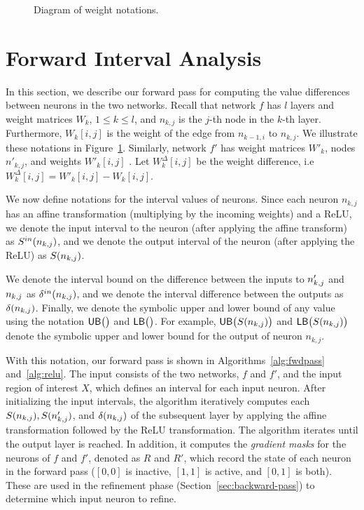 \begin{figure}
	\centering
	\scalebox{0.8}{
	
	}
	\caption{Diagram of weight notations.\label{fig:neuron_weights}}
\end{figure}

\section{Forward Interval Analysis}
\label{sec:forward-pass}

In this section, we describe our forward pass for computing the value
differences between neurons in the two networks.
Recall that network $f$ has $l$ layers and weight matrices $W_k$,
$1 \leq k \leq l$, and $n_{k,j}$ is the $j$-th node in the $k$-th
layer. Furthermore, $W_k[i,j]$ is the weight of the edge from
$n_{{k-1},i}$ to $n_{k,j}$. We illustrate these notations in Figure~\ref{fig:neuron_weights}.
%
Similarly, network $f'$ has weight matrices $ W'_k$, nodes $n'_{k,j}$,
and weights $W'_k[i,j]$ .
%
Let $ W^\Delta_k[i,j] $ be the weight difference, i.e $ W^\Delta_k[i,j] = W'_k[i,j]-W_k[i,j] $.


We now define notations for the interval values of neurons.
%
Since each neuron $n_{k,j}$ has an affine transformation (multiplying by the incoming weights)
and a ReLU, we denote the input interval to the neuron (after applying the affine transform) as $S^{in}(n_{k,j})$,
%
and we denote the output interval of the neuron (after applying
the ReLU) as $S(n_{k,j})$.
%
%
We denote the interval bound on the difference between the inputs to
$ n'_{k,j} $ and $ n_{k,j} $ as
$\delta^{in}(n_{k,j})$, and we denote the interval
difference between the outputs as $\delta(n_{k,j})$.
%
Finally, we denote the symbolic upper and lower bound of any value using the notation
$\mathsf{UB}\big(\big)$ and $\mathsf{LB}\big(\big)$. For example, $ \mathsf{UB}\big(S(n_{k,j})\big) $ and $ \mathsf{LB}\big(S(n_{k,j})\big)$
denote the symbolic upper and lower bound for the output of neuron $ n_{k,j} $.


With this notation, our forward pass is shown in
Algorithms~\ref{alg:fwdpass} and~\ref{alg:relu}.  The input consists of the two networks,
$f$ and $f'$, and the input region of interest $ X $, which defines
an interval for each input neuron.
%
After initializing the input intervals, the algorithm iteratively computes each
$S(n_{k,j}), S(n'_{k,j})$, and $ \delta(n_{k,j})$ of the
subsequent layer by applying the affine transformation followed by the ReLU
transformation. The algorithm iterates until the output layer is reached.
%
In addition, it computes the \textit{gradient masks} for the neurons of $ f $ and $ f' $, denoted as $ R $ and $ R' $,
which record the state of each neuron in the forward pass ($ [0,0] $ is inactive, $ [1,1] $ is active, and $ [0,1] $ is both).
These are used in the refinement phase (Section~\ref{sec:backward-pass}) to
determine which input neuron to refine.

